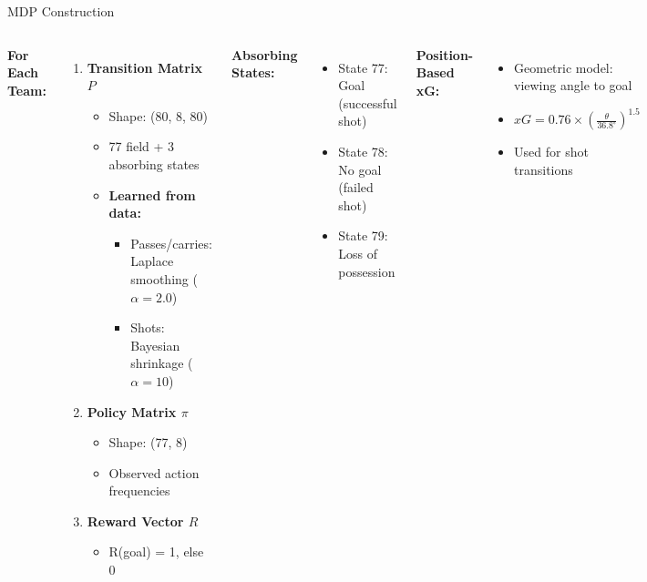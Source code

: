\documentclass[aspectratio=169]{beamer}
\begin{document}
\begin{frame}{MDP Construction}
\begin{columns}[T]
\textbf{For Each Team:}
\begin{enumerate}
    \item \textbf{Transition Matrix $P$}
    \begin{itemize}
        \item Shape: (80, 8, 80)
        \item 77 field + 3 absorbing states
        \item \textbf{Learned from data:}
        \begin{itemize}
            \item Passes/carries: Laplace smoothing ($\alpha = 2.0$)
            \item Shots: Bayesian shrinkage ($\alpha = 10$)
        \end{itemize}
    \end{itemize}
    
    \item \textbf{Policy Matrix $\pi$}
    \begin{itemize}
        \item Shape: (77, 8)
        \item Observed action frequencies
    \end{itemize}
    
    \item \textbf{Reward Vector $R$}
    \begin{itemize}
        \item R(goal) = 1, else 0
    \end{itemize}
\end{enumerate}

\textbf{Absorbing States:}
\begin{itemize}
    \item State 77: Goal (successful shot)
    \item State 78: No goal (failed shot)
    \item State 79: Loss of possession
\end{itemize}

\vspace{0.3cm}
\textbf{Position-Based xG:}
\begin{itemize}
    \item Geometric model: viewing angle to goal
    \item $xG = 0.76 \times \left(\frac{\theta}{36.8^{\circ}}\right)^{1.5}$
    \item Used for shot transitions
\end{itemize}
\end{columns}
\end{frame}
\end{document}
